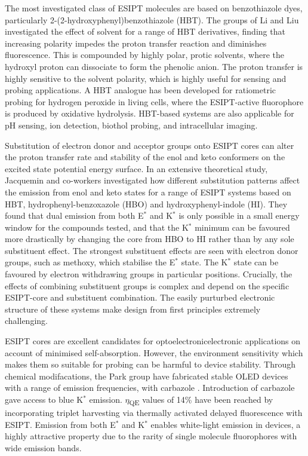 The most investigated class of ESIPT molecules are based on benzothiazole dyes, particularly 2-(2-hydroxyphenyl)benzothiazole (HBT).\cite{Padalkar2015,Kwon2011} The groups of Li and Liu investigated the effect of solvent for a range of HBT derivatives, finding that increasing polarity impedes the proton transfer reaction and diminishes fluorescence. This is compounded by highly polar, protic solvents, where the hydroxyl proton can dissociate to form the phenolic anion. The proton transfer is highly sensitive to the solvent polarity, which is highly useful for sensing and probing applications.\cite{Wang2009,Cheng2015f} A HBT analogue has been developed for ratiometric probing for hydrogen peroxide in living cells, where the ESIPT-active fluorophore is produced by oxidative hydrolysis.\cite{Tang2018a} HBT-based systems are also applicable for pH sensing, ion detection, biothol probing, and intracellular imaging.\cite{Kachwal2018,Kachwal2018,Liu2018}

Substitution of electron donor and acceptor groups onto ESIPT cores can alter the proton transfer rate and stability of the enol and keto conformers on the excited state potential energy surface. In an extensive theoretical study, Jacquemin and co-workers investigated how different substitution patterns affect the emission from enol and keto states for a range of ESIPT systems based on HBT, hydrophenyl-benzoxazole (HBO) and hydroxyphenyl-indole (HI).\cite{Azarias2016} They found that dual emission from both E$^*$ and K$^*$ is only possible in a small energy window for the compounds tested, and that the K$^*$ minimum can be favoured more drastically by changing the core from HBO to HI rather than by any sole substituent effect. The strongest substituent effects are seen with electron donor groups, such as methoxy, which stabilise the E$^*$ state. The K$^*$ state can be favoured by electron withdrawing groups in particular positions. Crucially, the effects of combining substituent groups is complex and depend on the specific ESIPT-core and substituent combination. The easily purturbed electronic structure of these systems make design from first principles extremely challenging.

ESIPT cores are excellent candidates for optoelectronicelectronic applications on account of minimised self-absorption. However, the environment sensitivity which makes them so suitable for probing can be harmful to device stability.\cite{Kwon2011} Through chemical modifacations, the Park group have fabricated stable OLED devices with a range of emission frequencies, with carbazole .\cite{Park2008,Park2009,Kim2011} Introduction of carbazole gave access to blue K$^*$ emission.\cite{Park2008} $\eta$\textsubscript{QE} values of 14\% have been reached by incorporating triplet harvesting via thermally activated delayed fluorescence with ESIPT.\cite{Mamada2017} Emission from both E$^*$ and K$^*$ enables white-light emission in devices, a highly attractive property due to the rarity of single molecule fluorophores with wide emission bands.\cite{Tang2011,Yao2011,Zhang2016b,Serdiuk2017}






